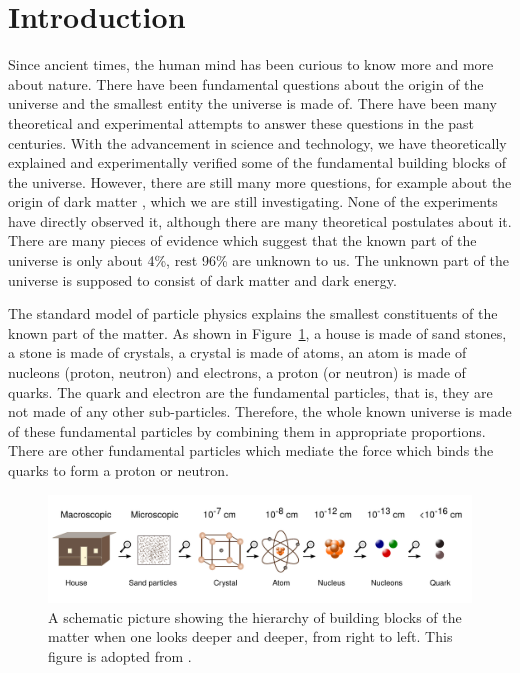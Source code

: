 \section{Introduction}
\label{s:secIntroSM} 
Since ancient times, the human mind has been curious to know more and more
about nature. There have been fundamental questions about the origin of the 
universe and the smallest entity the universe is made of. There have been many 
theoretical and experimental attempts to answer these questions in the past 
centuries. With the advancement in science and technology, we have 
theoretically explained and experimentally verified some of the fundamental building 
blocks of the universe. However, there are still many more questions, for example 
about the origin of dark matter \cite{Ade:2013zuv,Ade:2013sjv}, which we are 
still investigating. None of the 
experiments have directly observed it, although there are many theoretical 
postulates about it. There are many pieces of evidence which suggest that the 
known part of the universe is only about 4\%, rest 96\% are unknown to us. The 
unknown part of the universe is supposed to consist of dark matter and dark energy.

The standard model of particle physics explains the smallest constituents of 
the known part of the matter. As shown in Figure~\ref{fig:scale}, a house 
is made of sand stones, a stone is made of crystals, a crystal is made of atoms, 
an atom is made of nucleons (proton, neutron) and electrons, a proton (or neutron) 
is made of quarks. The quark and electron are the fundamental particles, that is, 
they are not made of any other sub-particles. Therefore, the whole known universe
is made of these fundamental particles by combining them in appropriate proportions.
There are other fundamental particles which mediate the force which binds the 
quarks to form a proton or neutron.
\begin{figure}
  \begin{center}
  \includegraphics[width=1.0\linewidth]{Theory/Image/scale.pdf}
	  \caption{A schematic picture showing the hierarchy of building blocks
	  of the matter when one looks deeper and deeper, from right to left.
	  This figure is adopted from \cite{scienceabc}.}
  \label{fig:scale}
  \end{center}
\end{figure}

